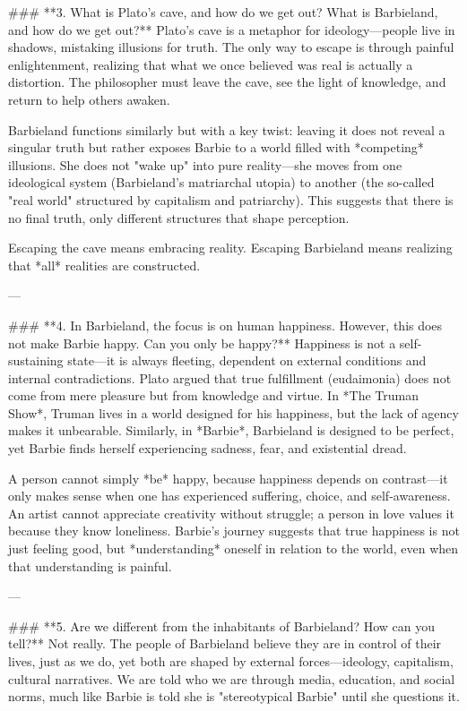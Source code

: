 ### **3. What is Plato’s cave, and how do we get out? What is Barbieland, and how do we get out?**  
Plato’s cave is a metaphor for ideology—people live in shadows, mistaking illusions for truth. The only way to escape is through painful enlightenment, realizing that what we once believed was real is actually a distortion. The philosopher must leave the cave, see the light of knowledge, and return to help others awaken.  

Barbieland functions similarly but with a key twist: leaving it does not reveal a singular truth but rather exposes Barbie to a world filled with *competing* illusions. She does not "wake up" into pure reality—she moves from one ideological system (Barbieland’s matriarchal utopia) to another (the so-called "real world" structured by capitalism and patriarchy). This suggests that there is no final truth, only different structures that shape perception.  

Escaping the cave means embracing reality. Escaping Barbieland means realizing that *all* realities are constructed.  

---

### **4. In Barbieland, the focus is on human happiness. However, this does not make Barbie happy. Can you only be happy?**  
Happiness is not a self-sustaining state—it is always fleeting, dependent on external conditions and internal contradictions. Plato argued that true fulfillment (eudaimonia) does not come from mere pleasure but from knowledge and virtue. In *The Truman Show*, Truman lives in a world designed for his happiness, but the lack of agency makes it unbearable. Similarly, in *Barbie*, Barbieland is designed to be perfect, yet Barbie finds herself experiencing sadness, fear, and existential dread.  

A person cannot simply *be* happy, because happiness depends on contrast—it only makes sense when one has experienced suffering, choice, and self-awareness. An artist cannot appreciate creativity without struggle; a person in love values it because they know loneliness. Barbie’s journey suggests that true happiness is not just feeling good, but *understanding* oneself in relation to the world, even when that understanding is painful.  

---

### **5. Are we different from the inhabitants of Barbieland? How can you tell?**  
Not really. The people of Barbieland believe they are in control of their lives, just as we do, yet both are shaped by external forces—ideology, capitalism, cultural narratives. We are told who we are through media, education, and social norms, much like Barbie is told she is "stereotypical Barbie" until she questions it.  


